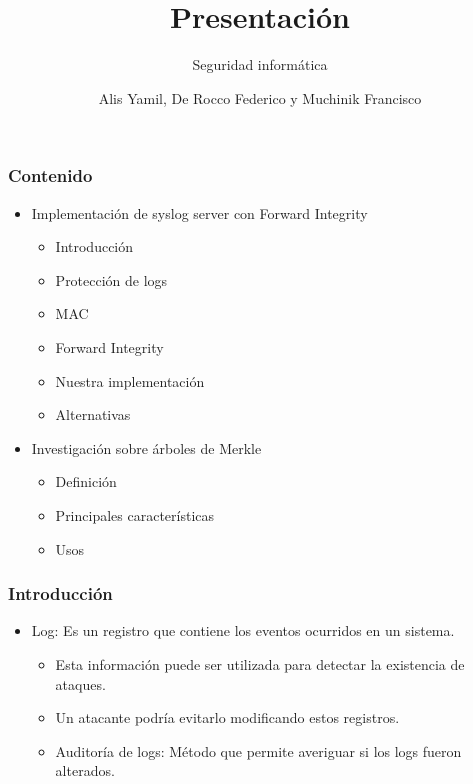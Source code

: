 \documentclass[10pt, a4paper,english,spanish]{beamer}
\title[Presentaci\'on]{Presentaci\'on}
\subtitle{Seguridad inform\'atica} %
\author{Alis Yamil, De Rocco Federico y Muchinik Francisco}
\institute{UBA} %
\begin{document}
\begin{frame}
\titlepage
\end{frame}

\begin{frame}
\frametitle{Contenido}
\begin{itemize}
  \item Implementaci\'on de syslog server con Forward Integrity
  \begin{itemize}
    \item Introducci\'on
    \item Protecci\'on de logs
    \item MAC
    \item Forward Integrity
    \item Nuestra implementaci\'on
    \item Alternativas
   \end{itemize}
  \item Investigaci\'on sobre \'arboles de Merkle
  \begin{itemize}
    \item Definici\'on
    \item Principales caracter\'isticas
    \item Usos
   \end{itemize}
\end{itemize}

\end{frame}

\begin{frame}
\frametitle{Introducción}
\begin{itemize}
\item Log: Es un registro que contiene los eventos ocurridos en un sistema.
\begin{itemize}
\item Esta información puede ser utilizada para detectar la existencia de ataques.
\item Un atacante podría evitarlo modificando estos registros.
\item Auditoría de logs: Método que permite averiguar si los logs fueron alterados.
\end{itemize}
\end{itemize}
\end{frame}
\end{document}
